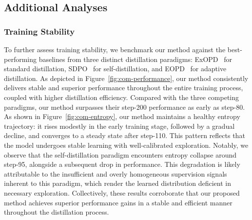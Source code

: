\documentclass[]{jingdong}
\theoremstyle{plain}
\theoremstyle{definition}
\theoremstyle{remark}
\begin{document}
\subsection{Additional Analyses}
\subsubsection{Training Stability}
To further assess training stability, we benchmark our method against the best-performing baselines from three distinct distillation paradigms: ExOPD~\citep{yang2026learning} for standard distillation, SDPO~\citep{hubotter2026reinforcement} for self-distillation, and EOPD~\citep{jin2026entropy} for adaptive distillation.
As depicted in Figure~\ref{fig:com-performance}, our method consistently delivers stable and superior performance throughout the entire training process, coupled with higher distillation efficiency. Compared with the three competing paradigms, our method surpasses their step-200 performance as early as step-80.
As shown in Figure~\ref{fig:com-entropy}, our method maintains a healthy entropy trajectory: it rises modestly in the early training stage, followed by a gradual decline, and converges to a steady state after step-110. This pattern reflects that the model undergoes stable learning with well-calibrated exploration.
Notably, we observe that the self-distillation paradigm encounters entropy collapse around step-95, alongside a subsequent drop in performance. This degradation is likely attributable to the insufficient and overly homogeneous supervision signals inherent to this paradigm, which render the learned distribution deficient in necessary exploration.
Collectively, these results corroborate that our proposed method achieves superior performance gains in a stable and efficient manner throughout the distillation process.
\end{document}
